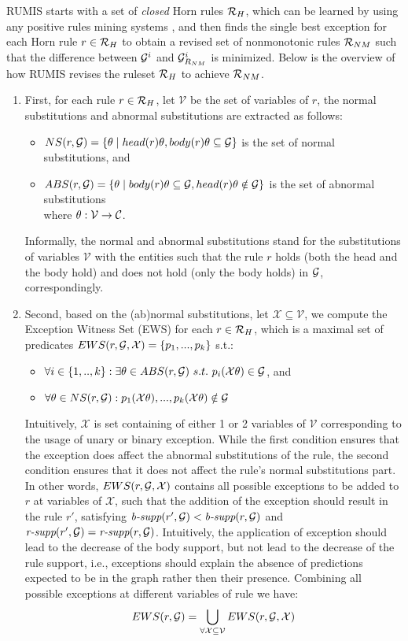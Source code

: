  RUMIS starts with a set of \textit{closed} Horn rules $\mathcal{R}_H$, which can be learned by using any positive rules mining systems \cite{amie,op,rdf2rules}, and then finds the single best exception for each Horn rule $r \in \mathcal{R}_H$ to obtain a revised set of nonmonotonic rules $\mathcal{R}_{NM}$ such that the difference between $\mathcal{G}^i$ and $\mathcal{G}^i_{R_{NM}}$ is minimized. Below is the overview of how RUMIS revises the ruleset $\mathcal{R}_H$ to achieve $\mathcal{R}_{NM}$.
\begin{enumerate}
\item First, for each rule $r \in \mathcal{R}_H$, let $\mathcal{V}$ be the set of variables of $r$, the normal substitutions and abnormal substitutions are extracted as follows:
\begin{itemize}
\item $NS(r, \mathcal{G}) = \{\theta \mid head(r)\theta, body(r)\theta \subseteq \mathcal{G}\}$ is the set of normal substitutions, and
\item $ABS(r, \mathcal{G}) = \{\theta \mid body(r)\theta \subseteq \mathcal{G} , head(r)\theta \notin \mathcal{G}\}$ is the set of abnormal substitutions\\
where $\theta: \mathcal{V} \rightarrow \mathcal{C}$.
\end{itemize}
Informally, the normal and abnormal substitutions stand for the substitutions of variables $\mathcal{V}$ with the entities such that the rule $r$ holds (both the head and the body hold) and does not hold (only the body holds) in $\mathcal{G}$, correspondingly.

\item Second, based on the (ab)normal substitutions, let $\mathcal{X} \subseteq \mathcal{V}$, we compute the Exception Witness Set (EWS) for each $r \in \mathcal{R}_H$, which is a maximal set of predicates $EWS(r,\mathcal{G},\mathcal{X}) = \{p_1,...,p_k\}$ s.t.:
\begin{itemize}
\item $\forall i \in \{1,..,k\} : \exists \theta \in ABS(r, \mathcal{G})\ s.t.\ p_i(\mathcal{X}\theta) \in \mathcal{G}$, and 
\item $\forall \theta \in NS(r,\mathcal{G}) :  p_1(\mathcal{X}\theta), ...,p_k(\mathcal{X}\theta) \notin \mathcal{G}$
\end{itemize}
Intuitively, $\mathcal{X}$ is set containing of either 1 or 2 variables of $\mathcal{V}$ corresponding to the usage of unary or binary exception. While the first condition ensures that the exception does affect the abnormal substitutions of the rule, the second condition ensures that it does not affect the rule's normal substitutions part. In other words, $EWS(r,\mathcal{G},\mathcal{X})$ contains all possible exceptions to be added to $r$ at variables of $\mathcal{X}$, such that the addition of the exception should result in the rule $r'$, satisfying $\textit{b-supp}(r', \mathcal{G}) < \textit{b-supp}(r, \mathcal{G})$ and $\textit{r-supp}(r', \mathcal{G}) = \textit{r-supp}(r, \mathcal{G})$. Intuitively, the application of exception should lead to the decrease of the body support, but not lead to the decrease of
the rule support, i.e., exceptions should explain the absence of predictions expected to be in the graph rather then their presence.
Combining all possible exceptions at different variables of rule we have:
\[EWS(r,\mathcal{G}) = \bigcup_{\forall\mathcal{X}\subseteq \mathcal{V}}EWS(r,\mathcal{G},\mathcal{X})\]


\end{enumerate}
